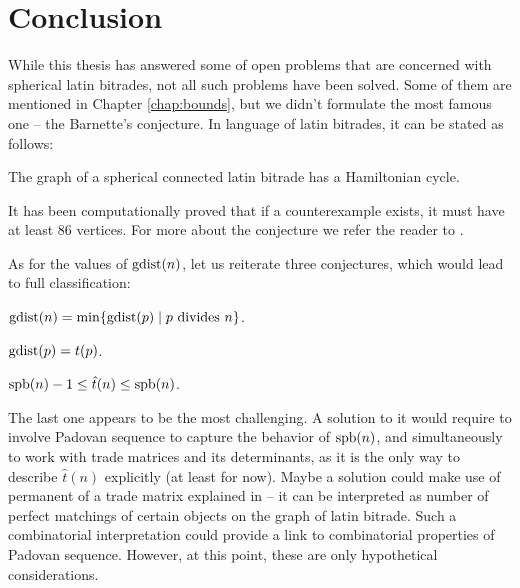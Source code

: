 \chapter*{Conclusion}

While this thesis has answered some of open problems that are concerned with spherical latin bitrades, not all such problems have been solved. Some of them are mentioned in Chapter \ref{chap:bounds}, but we didn't formulate the most famous one -- the Barnette's conjecture. In language of latin bitrades, it can be stated as follows:

\begin{conj*}[Barnette]
The graph of a spherical connected latin bitrade has a Hamiltonian cycle.
\end{conj*}%

\noindent
It has been computationally proved that if a counterexample exists, it must have at least 86 vertices. For more about the conjecture we refer the reader to \cite{Hertel05}.

\bigskip

As for the values of $\mathop{\mathrm{gdist}}(n)$, let us reiterate three conjectures, which would lead to full classification:

\begin{conj*}
$\mathop{\mathrm{gdist}}(n) = \min \{\mathop{\mathrm{gdist}}(p) \mid p \mbox{ divides } n\}$.
\end{conj*}%

\begin{conj*}
$\mathop{\mathrm{gdist}}(p) = t(p)$.
\end{conj*}%

\begin{conj*}
$\mathop{\mathrm{spb}}(n)-1 \leq \hat t(n) \leq \mathop{\mathrm{spb}}(n)$.
\end{conj*}%

The last one appears to be the most challenging. A solution to it would require to involve Padovan sequence to capture the behavior of $\mathop{\mathrm{spb}}(n)$, and simultaneously to work with trade matrices and its determinants, as it is the only way to describe $\hat t(n)$ explicitly (at least for now). Maybe a solution could make use of permanent of a trade matrix explained in \cite{CavenaghWanless09} -- it can be interpreted as number of perfect matchings of certain objects on the graph of latin bitrade. Such a combinatorial interpretation could provide a link to combinatorial properties of Padovan sequence. However, at this point, these are only hypothetical considerations.